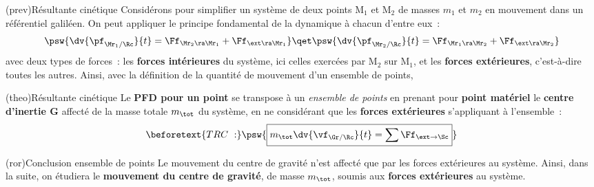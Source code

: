 \documentclass[../../main/main.tex]{subfiles}
\begin{document}
\begin{tcb*}(prev){Résultante cinétique}
	Considérons pour simplifier un système de deux points M$_1$ et M$_2$ de masses
	$m_1$ et $m_2$ en mouvement dans un référentiel galiléen. On peut appliquer le
	principe fondamental de la dynamique à chacun d'entre eux~:
	\[
		\psw{%
			\dv{\pf_{\Mr_1/\Rc}}{t} = \Ff_{\Mr_2\ra\Mr_1} + \Ff_{\ext\ra\Mr_1}
		}%
		\qet
		\psw{%
			\dv{\pf_{\Mr_2/\Rc}}{t} = \Ff_{\Mr_1\ra\Mr_2} + \Ff_{\ext\ra\Mr_2}
		}%
	\]
	avec deux types de forces~: les \textbf{forces intérieures} du système, ici
	celles exercées par M$_2$ sur M$_1$, et les \textbf{forces extérieures},
	c'est-à-dire toutes les autres. Ainsi, avec la définition de la quantité de
	mouvement d'un ensemble de points,
	\psw{%
		\[
			\dv{\pf_{\Sc/\Rc}}{t} =
			\dv{\pf_{\Mr_1/\Rc}}{t} + \dv{\pf_{\Mr_2/\Rc}}{t} =
			\underbracket[1pt]{\Ff_{\Mr_1\ra\Mr_2}+\Ff_{\Mr_2\ra\Mr_1}}_{= \of
				\text{ d'après la 3ème loi}} + \Ff_{\ext\ra\Mr_1} + \Ff_{\ext\ra\Mr_2}
			\qed
		\]
	}%
\end{tcb*}

\begin{tcb*}(theo){Résultante cinétique}
	Le \textbf{PFD pour un point} se transpose à un \textit{ensemble de points} en
	prenant pour \textbf{point matériel} le \textbf{centre d'inertie G} affecté de
	la masse totale $m_{\tot}$ du système, en ne considérant que les
	\textbf{forces extérieures} s'appliquant à l'ensemble~:
	\begin{gather*}
		\beforetext{TRC~:}
		\psw{%
			\boxed{m_{\tot}\dv{\vf_{\Gr/\Rc}}{t} = \sum \Ff_{\ext\to\Sc}}
		}%
	\end{gather*}
\end{tcb*}

\begin{tcb*}(ror){Conclusion ensemble de points}
	Le mouvement du centre de gravité n'est affecté que par les forces extérieures
	au système. Ainsi, dans la suite, on étudiera le \textbf{mouvement du centre
		de gravité}, de masse $m_{\tot}$, soumis aux \textbf{forces extérieures} au
	système.
\end{tcb*}
\end{document}
